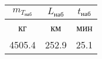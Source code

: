 \begin{tabular}{|c|c|c|}
\hline
$m_{T_{наб}}$ & $L_{наб}$ & $t_{наб}$ \\ 
\hline
кг & км & мин \\ 
\hline
4505.4 & 252.9 & 25.1 \\ 
\hline
\end{tabular}
